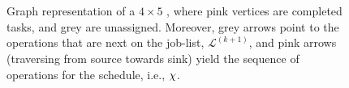 
\begin{figure}[p]\centering
    \\
    \\
    \caption[Graph representation for \JSP]{Graph representation of a 
    $4\times5$ \jsp, where pink vertices are completed tasks, and grey are 
    unassigned. Moreover, grey arrows point to the operations that are 
    next on the job-list, $\mathcal{L}^{(k+1)}$, and pink arrows 
    (traversing from source towards sink) yield the sequence of operations for 
    the schedule, i.e., ${\mathbf{\chi}}$.}\label{fig:example:graph}
\end{figure}
